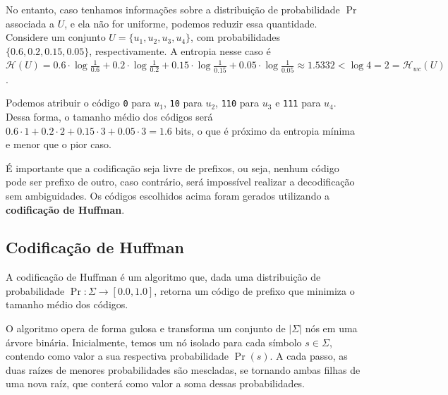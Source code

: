 \documentclass[a4paper, 12pt, english, brazilian]{article}
\begin{document}
No entanto, caso tenhamos informações sobre a distribuição de probabilidade $\Pr$ associada a $U$, e ela não
for uniforme, podemos reduzir essa quantidade. Considere um conjunto $U = \{u_1, u_2, u_3, u_4\}$,
com probabilidades $\{0.6, 0.2, 0.15, 0.05\}$, respectivamente. A entropia nesse caso é $\mathcal{H}(U) = 
0.6 \cdot \log\frac{1}{0.6} + 0.2 \cdot \log\frac{1}{0.2} 
+ 0.15 \cdot \log\frac{1}{0.15} + 0.05 \cdot \log\frac{1}{0.05} \approx 1.5332 < \log4 = 2 = \mathcal{H}_{wc}(U)$.

Podemos atribuir o código \texttt{0} para $u_1$, \texttt{10} para $u_2$, \texttt{110} para $u_3$ e \texttt{111}
para $u_4$. Dessa forma, o tamanho médio dos códigos será $0.6 \cdot 1 + 0.2 \cdot 2 + 0.15 \cdot 3 
+ 0.05 \cdot 3 = 1.6$ bits, o que é próximo da entropia mínima e menor que o pior caso.

É importante que a codificação seja livre de prefixos, ou seja, nenhum código pode ser prefixo de outro, caso
contrário, será impossível realizar a decodificação sem ambiguidades. Os códigos escolhidos acima foram gerados
utilizando a \textbf{codificação de Huffman}.

\subsection{Codificação de Huffman}
A codificação de Huffman é um algoritmo que, dada uma distribuição de probabilidade $\Pr : \Sigma \to [0.0, 1.0]$, 
retorna um código de prefixo que minimiza o tamanho médio dos códigos.

O algoritmo opera de forma gulosa e transforma um conjunto de $|\Sigma|$ nós em uma árvore binária. Inicialmente, temos
um nó isolado para cada símbolo $s \in \Sigma$, contendo como valor a sua respectiva probabilidade $\Pr(s)$. A cada passo, as duas raízes
de menores probabilidades são mescladas, se tornando ambas filhas de uma nova raíz, que conterá como valor a soma
dessas probabilidades.
\end{document}
